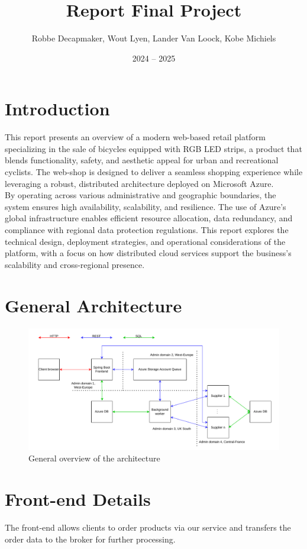 \documentclass[10pt,a4paper,kul]{kulakarticle} %
\date{2024 -- 2025}
\title{Report Final Project}
\author{Robbe Decapmaker, Wout Lyen, Lander Van Loock, Kobe Michiels}
\begin{document}
	\maketitle  
	\section*{Introduction}
		This report presents an overview of a modern web-based retail platform specializing in the sale of bicycles equipped with RGB LED strips, a product that blends functionality, safety, and aesthetic appeal for urban and recreational cyclists. The web-shop is designed to deliver a seamless shopping experience while leveraging a robust, distributed architecture deployed on Microsoft Azure.\\
		By operating across various administrative and geographic boundaries, the system ensures high availability, scalability, and resilience. The use of Azure’s global infrastructure enables efficient resource allocation, data redundancy, and compliance with regional data protection regulations. This report explores the technical design, deployment strategies, and operational considerations of the platform, with a focus on how distributed cloud services support the business’s scalability and cross-regional presence.

	\section{General Architecture}
		\begin{figure}[h]
			\centering
			\includegraphics[width=1\linewidth]{images/arch}
			\caption{General overview of the architecture}
			\label{fig:arch}
		\end{figure}
		
	\section{Front-end Details}
	The front-end allows clients to order products via our service and transfers the order data to the broker for further processing.
	
\end{document}
